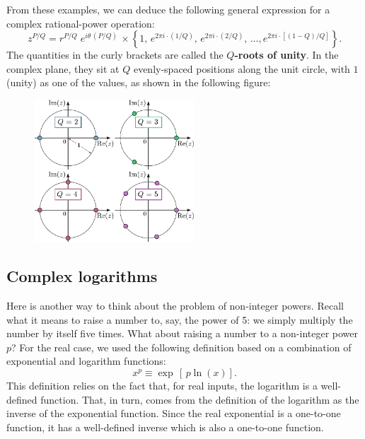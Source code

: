 \documentclass[10pt,a4paper]{article}
\begin{document}
From these examples, we can deduce the following general expression
for a complex rational-power operation:
\begin{equation}
  z^{P/Q} = r^{P/Q} \; e^{i\theta\, (P/Q)}\, \times
  \left\{1,\, e^{2\pi i \cdot (1/Q)},\, e^{2\pi i \cdot (2/Q)},\, \dots, e^{2\pi i \cdot [(1-Q)/Q]} \right\}.
\end{equation}
The quantities in the curly brackets are called the \textbf{$Q$-roots
  of unity}. In the complex plane, they sit at $Q$ evenly-spaced
positions along the unit circle, with $1$ (unity) as one of the
values, as shown in the following figure:

\begin{figure}[h]
  \centering\includegraphics[width=0.53\textwidth]{roots_of_unity}
\end{figure}
    
\subsection{Complex logarithms}
\label{complex-logarithms}

Here is another way to think about the problem of non-integer powers.
Recall what it means to raise a number to, say, the power of 5: we
simply multiply the number by itself five times. What about raising a
number to a non-integer power $p$? For the real case, we used the
following definition based on a combination of exponential and
logarithm functions:
\begin{equation}
  x^p \equiv \exp\,\left[\,p\ln(x)\right].
\end{equation}
This definition relies on the fact that, for real inputs, the
logarithm is a well-defined function. That, in turn, comes from the
definition of the logarithm as the inverse of the exponential
function. Since the real exponential is a one-to-one function, it has
a well-defined inverse which is also a one-to-one function.
\end{document}

